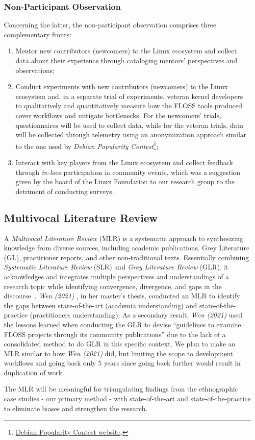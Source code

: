 \subsubsection{Non-Participant Observation}

Concerning the latter, the non-participant observation comprises three complementary fronts:

\begin{enumerate}
    \item Mentor new contributors (newcomers) to the Linux ecosystem and collect data about their experience through cataloging mentors' perspectives and observations;
    \item Conduct experiments with new contributors (newcomers) to the Linux ecosystem and, in a separate trial of experiments, veteran kernel developers to qualitatively and quantitatively measure how the FLOSS tools produced cover workflows and mitigate bottlenecks. For the newcomers' trials, questionnaires will be used to collect data, while for the veteran trials, data will be collected through telemetry using an anonymization approach similar to the one used by \textit{Debian Popularity Contest}\footnote{\href{https://popcon.debian.org/}{Debian Popularity Contest website}.};
    \item Interact with key players from the Linux ecosystem and collect feedback through \textit{in-loco} participation in community events, which was a suggestion given by the board of the Linux Foundation to our research group to the detriment of conducting surveys.
\end{enumerate}

\subsection{Multivocal Literature Review}

A \textit{Multivocal Literature Review} (MLR) is a systematic approach to synthesizing knowledge from diverse sources, including academic publications, Grey Literature (GL), practitioner reports, and other non-traditional texts. Essentially combining \textit{Systematic Literature Review} (SLR) and \textit{Grey Literature Review} (GLR), it acknowledges and integrates multiple perspectives and understandings of a research topic while identifying convergence, divergence, and gaps in the discourse~\cite{vahid2018-mlr}. \textit{Wen (2021)} \cite{wen2021-masterthesis}, in her master's thesis, conducted an MLR to identify the gaps between state-of-the-art (academia understanding) and state-of-the-practice (practitioners understanding). As a secondary result, \textit{Wen (2021)} \cite{wen2021-masterthesis} used the lessons learned when conducting the GLR to devise ``guidelines to examine FLOSS projects through its community publications'' due to the lack of a consolidated method to do GLR in this specific context. We plan to make an MLR similar to how \textit{Wen (2021)} \cite{wen2021-masterthesis} did, but limiting the scope to development workflows and going back only 5 years since going back further would result in duplication of work.

The MLR will be meaningful for triangulating findings from the ethnographic case studies - our primary method - with state-of-the-art and state-of-the-practice to eliminate biases and strengthen the research.
